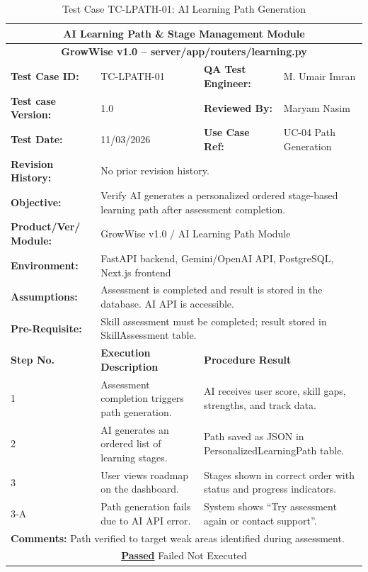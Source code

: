 \documentclass{FastFyp}
\begin{document}
\begin{table}[H]
\footnotesize
\centering
\caption{Test Case TC-LPATH-01: AI Learning Path Generation}
\label{tab:tclpath}
\begin{tabular}{|p{2.5cm}|p{4cm}|p{2.5cm}|p{4.5cm}|}
\hline
\multicolumn{4}{|c|}{\textbf{AI Learning Path \& Stage Management Module}} \\ \hline
\multicolumn{4}{|c|}{\textbf{GrowWise v1.0 -- server/app/routers/learning.py}} \\ \hline
\textbf{Test Case ID:} & TC-LPATH-01 & \textbf{QA Test Engineer:} & M. Umair Imran \\ \hline
\textbf{Test case Version:} & 1.0 & \textbf{Reviewed By:} & Maryam Nasim \\ \hline
\textbf{Test Date:} & 11/03/2026 & \textbf{Use Case Ref:} & UC-04 Path Generation \\ \hline
\textbf{Revision History:} & \multicolumn{3}{p{11cm}|}{No prior revision history.} \\ \hline
\textbf{Objective:} & \multicolumn{3}{p{11cm}|}{Verify AI generates a personalized ordered stage-based learning path after assessment completion.} \\ \hline
\textbf{Product/Ver/ Module:} & \multicolumn{3}{p{11cm}|}{GrowWise v1.0 / AI Learning Path Module} \\ \hline
\textbf{Environment:} & \multicolumn{3}{p{11cm}|}{FastAPI backend, Gemini/OpenAI API, PostgreSQL, Next.js frontend} \\ \hline
\textbf{Assumptions:} & \multicolumn{3}{p{11cm}|}{Assessment is completed and result is stored in the database. AI API is accessible.} \\ \hline
\textbf{Pre-Requisite:} & \multicolumn{3}{p{11cm}|}{Skill assessment must be completed; result stored in SkillAssessment table.} \\ \hline
\textbf{Step No.} & \textbf{Execution Description} & \multicolumn{2}{p{7cm}|}{\textbf{Procedure Result}} \\ \hline
1 & Assessment completion triggers path generation. & \multicolumn{2}{p{7cm}|}{AI receives user score, skill gaps, strengths, and track data.} \\ \hline
2 & AI generates an ordered list of learning stages. & \multicolumn{2}{p{7cm}|}{Path saved as JSON in PersonalizedLearningPath table.} \\ \hline
3 & User views roadmap on the dashboard. & \multicolumn{2}{p{7cm}|}{Stages shown in correct order with status and progress indicators.} \\ \hline
3-A & Path generation fails due to AI API error. & \multicolumn{2}{p{7cm}|}{System shows ``Try assessment again or contact support''.} \\ \hline
\multicolumn{4}{|p{13.5cm}|}{\textbf{Comments:} Path verified to target weak areas identified during assessment.} \\ \hline
\multicolumn{4}{|c|}{\underline{\textbf{Passed}} \quad\quad\quad Failed \quad\quad\quad Not Executed} \\ \hline
\end{tabular}
\end{table}
\end{document}
